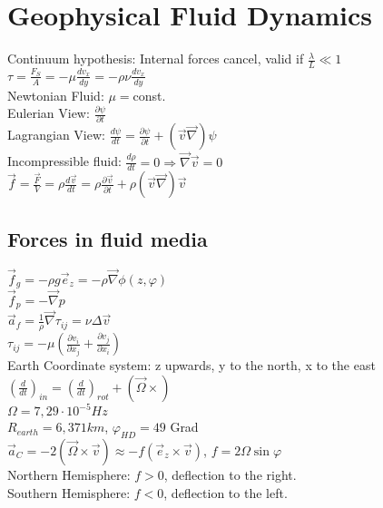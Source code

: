 \section*{Geophysical Fluid Dynamics}
Continuum hypothesis: Internal forces cancel, valid if $\frac{\lambda}{L}\ll 1$\\
$\tau=\frac{F_S}{A}=-\mu\frac{dv_x}{dy}=-\rho\nu\frac{dv_x}{dy}$\\
Newtonian Fluid: $\mu=$const.\\
Eulerian View: $\frac{\partial\psi}{\partial t}$\\
Lagrangian View: $\frac{d\psi}{dt}=\frac{\partial\psi}{\partial t} + (\vec{v}\vec{\nabla})\psi$\\
Incompressible fluid: $\frac{d\rho}{dt}=0 \Rightarrow \vec{\nabla}\vec{v}=0$\\
$\vec{f}=\frac{\vec{F}}{V}=\rho \frac{d\vec{v}}{dt}=\rho\frac{\partial\vec{v}}{\partial t}+\rho(\vec{v}\vec{\nabla})\vec{v}$
\subsection*{Forces in fluid media}
$\vec{f}_g=-\rho g \vec{e}_z = -\rho\vec{\nabla}\phi(z,\varphi)$\\
$\vec{f}_p=-\vec{\nabla}p$\\
$\vec{a}_f=\frac{1}{\rho}\vec{\nabla}\tau_{ij}=\nu\Delta \vec{v}$\\
$\tau_{ij}=-\mu\left(\frac{\partial v_i}{\partial x_j}+\frac{\partial v_j}{\partial x_i}\right)$\\
Earth Coordinate system: z upwards, y to the north, x to the east\\
$\left(\frac{d}{dt}\right)_{in}=\left(\frac{d}{dt}\right)_{rot}+(\vec{\Omega}\times)$\\
$\Omega=7,29\cdot10^{-5}Hz$\\
$R_{earth}=6,371km$, $\varphi_{HD}=49$ Grad\\
$\vec{a}_C=-2(\vec{\Omega}\times\vec{v})\approx -f(\vec{e}_z\times\vec{v})$, $f=2\Omega\sin{\varphi}$\\
Northern Hemisphere: $f>0$, deflection to the right.\\
Southern Hemisphere: $f<0$, deflection to the left.\\
